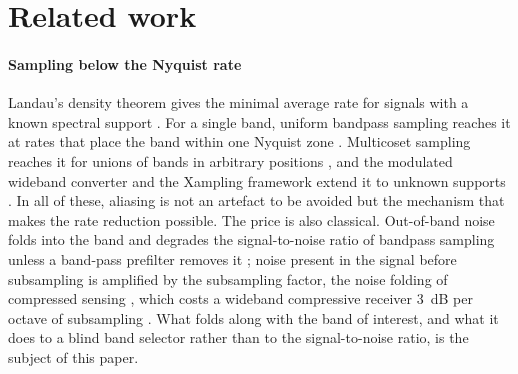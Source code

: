 \section{Related work}
\label{sec:related}

\paragraph{Sampling below the Nyquist rate}
Landau's density theorem gives the minimal average rate for signals with a known spectral support
\citep{landau1967}. For a single band, uniform bandpass sampling reaches it at rates that place the
band within one Nyquist zone \citep{vaughan1991}. Multicoset sampling reaches it for unions of bands
in arbitrary positions \citep{venkataramani2001optimal}, and the modulated wideband converter and
the Xampling framework extend it to unknown supports \citep{mishali2009xampling,mishali2010practice,
eldar2015}. In all of these, aliasing is not an artefact to be avoided but the mechanism that makes
the rate reduction possible. The price is also classical. Out-of-band noise folds into the band and
degrades the signal-to-noise ratio of bandpass sampling unless a band-pass prefilter removes it
\citep{vaughan1991}; noise present in the signal before subsampling is amplified by the subsampling
factor, the noise folding of compressed sensing \citep{ariascastro2011noisefolding}, which costs a
wideband compressive receiver 3~dB per octave of subsampling \citep{davenport2012noisefolding}.
What folds along with the band of interest, and what it does to a blind band selector rather than
to the signal-to-noise ratio, is the subject of this paper.

